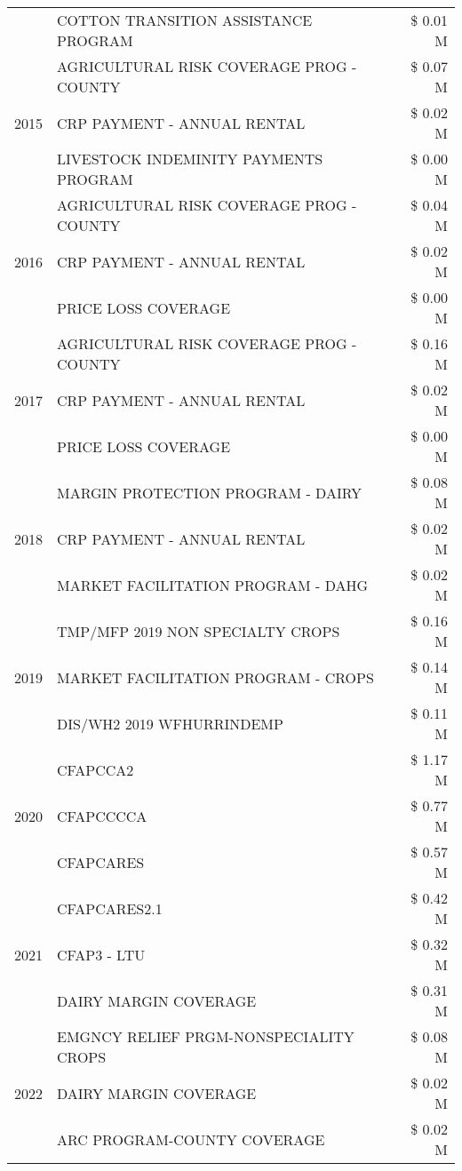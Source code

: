 \begin{tabular}{llr}
 & COTTON TRANSITION ASSISTANCE PROGRAM & \$ 0.01 M \\
\cline{1-3}
\multirow[t]{3}{*}{2015} & AGRICULTURAL RISK COVERAGE PROG - COUNTY & \$ 0.07 M \\
 & CRP PAYMENT - ANNUAL RENTAL & \$ 0.02 M \\
 & LIVESTOCK INDEMINITY PAYMENTS PROGRAM & \$ 0.00 M \\
\cline{1-3}
\multirow[t]{3}{*}{2016} & AGRICULTURAL RISK COVERAGE PROG - COUNTY & \$ 0.04 M \\
 & CRP PAYMENT - ANNUAL RENTAL & \$ 0.02 M \\
 & PRICE LOSS COVERAGE & \$ 0.00 M \\
\cline{1-3}
\multirow[t]{3}{*}{2017} & AGRICULTURAL RISK COVERAGE PROG - COUNTY & \$ 0.16 M \\
 & CRP PAYMENT - ANNUAL RENTAL & \$ 0.02 M \\
 & PRICE LOSS COVERAGE & \$ 0.00 M \\
\cline{1-3}
\multirow[t]{3}{*}{2018} & MARGIN PROTECTION PROGRAM - DAIRY & \$ 0.08 M \\
 & CRP PAYMENT - ANNUAL RENTAL & \$ 0.02 M \\
 & MARKET FACILITATION PROGRAM - DAHG & \$ 0.02 M \\
\cline{1-3}
\multirow[t]{3}{*}{2019} & TMP/MFP 2019 NON SPECIALTY CROPS & \$ 0.16 M \\
 & MARKET FACILITATION PROGRAM - CROPS & \$ 0.14 M \\
 & DIS/WH2 2019 WFHURRINDEMP & \$ 0.11 M \\
\cline{1-3}
\multirow[t]{3}{*}{2020} & CFAPCCA2 & \$ 1.17 M \\
 & CFAPCCCCA & \$ 0.77 M \\
 & CFAPCARES & \$ 0.57 M \\
\cline{1-3}
\multirow[t]{3}{*}{2021} & CFAPCARES2.1 & \$ 0.42 M \\
 & CFAP3 - LTU & \$ 0.32 M \\
 & DAIRY MARGIN COVERAGE & \$ 0.31 M \\
\cline{1-3}
\multirow[t]{3}{*}{2022} & EMGNCY RELIEF PRGM-NONSPECIALITY CROPS & \$ 0.08 M \\
 & DAIRY MARGIN COVERAGE & \$ 0.02 M \\
 & ARC PROGRAM-COUNTY COVERAGE & \$ 0.02 M \\
\cline{1-3}
\bottomrule
\end{tabular}
